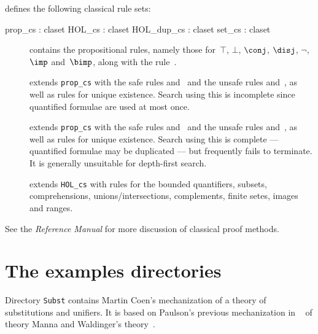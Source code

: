 {\HOL} defines the following classical rule sets:
\begin{ttbox} 
prop_cs    : claset
HOL_cs     : claset
HOL_dup_cs : claset
set_cs     : claset
\end{ttbox}
\begin{description}
\item[] contains the propositional rules, namely
those for~$\top$, $\bot$, $\conj$, $\disj$, $\neg$, $\imp$ and~$\bimp$,
along with the rule~.

\item[] 
extends {\tt prop_cs} with the safe rules  and~
and the unsafe rules  and~, as well as rules for
unique existence.  Search using this is incomplete since quantified
formulae are used at most once.

\item[] 
extends {\tt prop_cs} with the safe rules  and~
and the unsafe rules  and~, as well as
rules for unique existence.  Search using this is complete --- quantified
formulae may be duplicated --- but frequently fails to terminate.  It is
generally unsuitable for depth-first search.

\item[] 
extends {\tt HOL_cs} with rules for the bounded quantifiers, subsets,
comprehensions, unions/intersections, complements, finite setes, images and
ranges.
\end{description}
\noindent
See the {\em Reference Manual} for more discussion of classical proof
methods.


\section{The examples directories}
Directory {\tt Subst} contains Martin Coen's mechanization of a theory of
substitutions and unifiers.  It is based on Paulson's previous
mechanization in {\LCF}~\cite{paulson85} of theory Manna and Waldinger's
theory~\cite{mw81}. 

